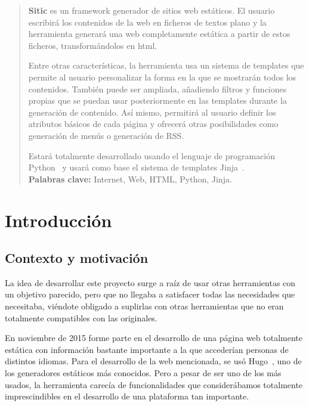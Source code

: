 \documentclass[a4paper,12pt]{article}
\begin{document}
\portada

\vspace{0.25cm}

\begin{abstract}
\textbf{Sitic} es un framework generador de sitios web estáticos. El usuario escribirá
los contenidos de la web en ficheros de textos plano y la
herramienta generará una web completamente estática a partir de estos ficheros,
transformándolos en html.

Entre otras características, la herramienta usa un sistema de templates que permite al
usuario personalizar la forma en la que se mostrarán todos los contenidos. También puede
ser ampliada, añadiendo filtros y funciones propias que se puedan usar posteriormente en
las templates durante la generación de contenido. Así mismo, permitirá al usuario definir los
atributos básicos de cada página y ofrecerá otras posibilidades como generación de menús
o generación de RSS.

Estará totalmente desarrollado usando el lenguaje de programación Python~\cite{python} y usará como
base el sistema de templates Jinja~\cite{jinja}. \\

\textbf{Palabras clave:} Internet, Web, HTML, Python, Jinja.

\end{abstract}



\section{Introducción}

\subsection{Contexto y motivación}

La idea de desarrollar este proyecto surge a raíz de usar otras herramientas con un objetivo
parecido, pero que no llegaba a satisfacer todas las necesidades que necesitaba, viéndote obligado
a suplirlas con otras herramientas que no eran totalmente compatibles con las originales.

En noviembre de 2015 forme parte en el desarrollo de una página web totalmente estática con información
bastante importante a la que accederían personas de distintos idiomas. Para el desarrollo de la web mencionada,
se usó Hugo~\cite{hugo}, uno de los generadores estáticos más conocidos. Pero a pesar de ser uno de los más usados,
la herramienta carecía de funcionalidades que considerábamos totalmente imprescindibles en el desarrollo
de una plataforma tan importante.
\end{document}
